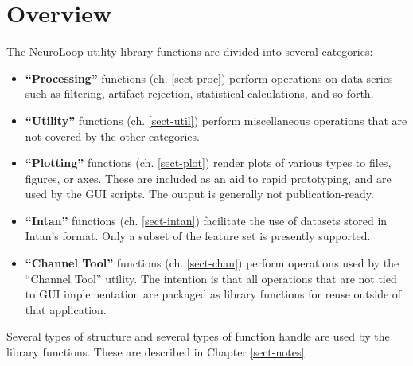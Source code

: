 
\chapter{Overview}
\label{sect-over}

The NeuroLoop utility library functions are divided into several categories:

\begin{itemize}

\item \textbf{``Processing''} functions (ch. \ref{sect-proc}) perform
operations on data series such as filtering, artifact rejection, statistical
calculations, and so forth.

\item \textbf{``Utility''} functions (ch. \ref{sect-util}) perform
miscellaneous operations that are not covered by the other categories.

\item \textbf{``Plotting''} functions (ch. \ref{sect-plot}) render plots
of various types to files, figures, or axes. These are included as an aid
to rapid prototyping, and are used by the GUI scripts. The output is
generally not publication-ready.

\item \textbf{``Intan''} functions (ch. \ref{sect-intan}) facilitate the use
of datasets stored in Intan's format. Only a subset of the feature set is
presently supported.

\item \textbf{``Channel Tool''} functions (ch. \ref{sect-chan}) perform
operations used by the ``Channel Tool'' utility. The intention is that all
operations that are not tied to GUI implementation are packaged as library
functions for reuse outside of that application.

\end{itemize}

Several types of structure and several types of function handle are used by
the library functions. These are described in Chapter \ref{sect-notes}.


%
